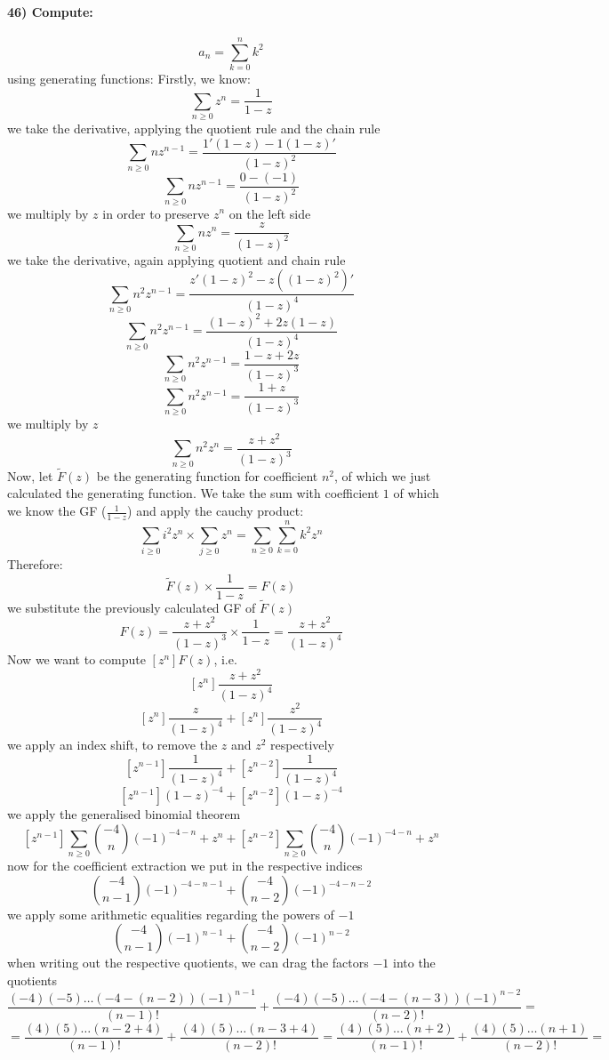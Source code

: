 \documentclass[
]{article}
\begin{document}
\hypertarget{compute}{%
\paragraph{46) Compute:}\label{compute}}

\[
a_n = \sum_{k=0}^{n} k^2
\] using generating functions: Firstly, we know: \[
\sum_{n \geq 0} z^n = \frac{1}{1-z}
\] we take the derivative, applying the quotient rule and the chain rule
\[
\sum_{n \geq 0} n z^{n-1} = \frac{1'(1-z) - 1(1-z)'}{(1-z)^2}
\] \[
\sum_{n \geq 0} n z^{n-1} = \frac{0 - (-1)}{(1-z)^2}
\] we multiply by \(z\) in order to preserve \(z^n\) on the left side \[
\sum_{n \geq 0} n z^{n} = \frac{z}{(1-z)^2}
\] we take the derivative, again applying quotient and chain rule \[
\sum_{n \geq 0} n^2 z^{n-1} = \frac{z'(1-z)^2 - z ((1-z)^2)'}{(1-z)^4}
\] \[
\sum_{n \geq 0} n^2 z^{n-1} = \frac{(1-z)^2 +2z(1-z)}{(1-z)^4}
\] \[
\sum_{n \geq 0} n^2 z^{n-1} = \frac{1-z+2z}{(1-z)^3}
\] \[
\sum_{n \geq 0} n^2 z^{n-1} = \frac{1+z}{(1-z)^3}
\] we multiply by \(z\) \[
\sum_{n \geq 0} n^2 z^{n} = \frac{z+z^2}{(1-z)^3}
\] Now, let \(\tilde F(z)\) be the generating function for coefficient
\(n^2\), of which we just calculated the generating function. We take
the sum with coefficient \(1\) of which we know the GF
(\(\frac{1}{1-z}\)) and apply the cauchy product: \[
\sum_{i \geq 0} i^2z^n \times \sum_{j \geq 0} z^n = \sum_{n \geq 0} \sum_{k=0}^{n} k^2 z^n 
\] Therefore: \[
\tilde F(z) \times \frac{1}{1-z} = F(z)
\] we substitute the previously calculated GF of \(\tilde F(z)\) \[
F(z) = \frac{z+z^2}{(1-z)^3}\times \frac{1}{1-z} = \frac{z+z^2}{(1-z)^4}
\] Now we want to compute \([z^n]F(z)\), i.e. \[
[z^n]\frac{z+z^2}{(1-z)^4}
\] \[
[z^n]\frac{z}{(1-z)^4} + [z^n]\frac{z^2}{(1-z)^4}
\] we apply an index shift, to remove the \(z\) and \(z^2\) respectively
\[
[z^{n-1}]\frac{1}{(1-z)^4} + [z^{n-2}]\frac{1}{(1-z)^4}
\] \[
[z^{n-1}] (1-z)^{-4} + [z^{n-2}] (1-z)^{-4}
\] we apply the generalised binomial theorem \[
[z^{n-1}] \sum_{n \geq 0} \binom{-4}{n}(-1)^{-4-n}+z^n + [z^{n-2}] \sum_{n \geq 0} \binom{-4}{n}(-1)^{-4-n}+z^n
\] now for the coefficient extraction we put in the respective indices
\[
\binom{-4}{n-1}(-1)^{-4-n-1} + \binom{-4}{n-2}(-1)^{-4-n-2}
\] we apply some arithmetic equalities regarding the powers of \(-1\) \[
\binom{-4}{n-1}(-1)^{n-1} + \binom{-4}{n-2}(-1)^{n-2}
\] when writing out the respective quotients, we can drag the factors
\(-1\) into the quotients \[
\frac{(-4)(-5) \dots (-4-(n-2)) (-1)^{n-1}}{(n-1)! } + \frac{(-4)(-5) \dots (-4-(n-3)) (-1)^{n-2}}{(n-2)!} =
\] \[
= \frac{(4)(5) \dots (n - 2 + 4)}{(n-1)!} + \frac{(4)(5) \dots (n - 3 + 4)}{(n-2)!} = \frac{(4)(5) \dots (n + 2)}{(n-1)!} + \frac{(4)(5) \dots (n + 1)}{(n-2)!} = 
\]
\end{document}
